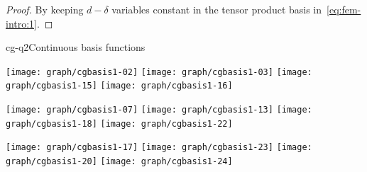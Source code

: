 \begin{proof}
  By keeping $d-\delta$ variables constant in the tensor product basis
  in~\eqref{eq:fem-intro:1}.
\end{proof}

\begin{Example*}{cg-q2}{Continuous basis functions}
  \begin{center}
    \texttt{[image: graph/cgbasis1-02]}
    \texttt{[image: graph/cgbasis1-03]}
    \texttt{[image: graph/cgbasis1-15]}
    \texttt{[image: graph/cgbasis1-16]}

    \texttt{[image: graph/cgbasis1-07]}
    \texttt{[image: graph/cgbasis1-13]}
    \texttt{[image: graph/cgbasis1-18]}
    \texttt{[image: graph/cgbasis1-22]}

    \texttt{[image: graph/cgbasis1-17]}
    \texttt{[image: graph/cgbasis1-23]}
    \texttt{[image: graph/cgbasis1-20]}
    \texttt{[image: graph/cgbasis1-24]}
  \end{center}
\end{Example*}




